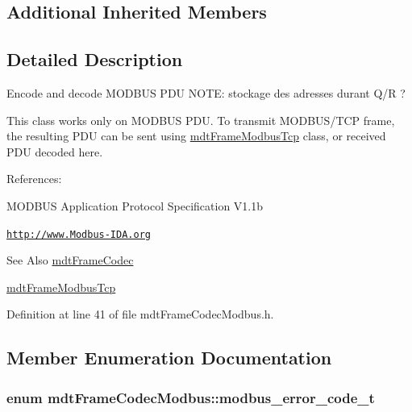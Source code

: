 \subsection*{Additional Inherited Members}


\subsection{Detailed Description}
Encode and decode M\-O\-D\-B\-U\-S P\-D\-U N\-O\-T\-E\-: stockage des adresses durant Q/\-R ? 

This class works only on M\-O\-D\-B\-U\-S P\-D\-U. To transmit M\-O\-D\-B\-U\-S/\-T\-C\-P frame, the resulting P\-D\-U can be sent using \hyperlink{classmdt_frame_modbus_tcp}{mdt\-Frame\-Modbus\-Tcp} class, or received P\-D\-U decoded here.

References\-:
\begin{DoxyItemize}
\item M\-O\-D\-B\-U\-S Application Protocol Specification V1.\-1b
\item \href{http://www.Modbus-IDA.org}{\tt http\-://www.\-Modbus-\/\-I\-D\-A.\-org}
\end{DoxyItemize}

\begin{DoxySeeAlso}{See Also}
\hyperlink{classmdt_frame_codec}{mdt\-Frame\-Codec} 

\hyperlink{classmdt_frame_modbus_tcp}{mdt\-Frame\-Modbus\-Tcp} 
\end{DoxySeeAlso}


Definition at line 41 of file mdt\-Frame\-Codec\-Modbus.\-h.



\subsection{Member Enumeration Documentation}
\hypertarget{classmdt_frame_codec_modbus_a31d8291be7f8636d5d295ce3066d7ac7}{
\subsubsection[{modbus\-\_\-error\-\_\-code\-\_\-t}]{\setlength{\rightskip}{0pt plus 5cm}enum {\bf mdt\-Frame\-Codec\-Modbus\-::modbus\-\_\-error\-\_\-code\-\_\-t}}}\label{classmdt_frame_codec_modbus_a31d8291be7f8636d5d295ce3066d7ac7}


